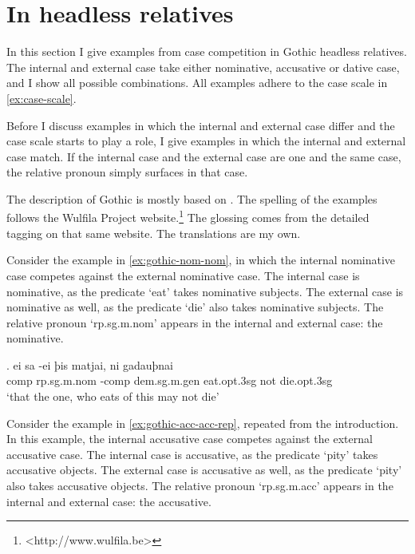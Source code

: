 \section{In headless relatives}\label{sec:pattern-rels}

In this section I give examples from case competition in Gothic headless relatives. The internal and external case take either nominative, accusative or dative case, and I show all possible combinations. All examples adhere to the case scale in \ref{ex:case-scale}.

Before I discuss examples in which the internal and external case differ and the case scale starts to play a role, I give examples in which the internal and external case match.
If the internal case and the external case are one and the same case, the relative pronoun simply surfaces in that case.

The description of Gothic is mostly based on \citep{harbert1978}. The spelling of the examples follows the Wulfila Project website.\footnote{
<http://www.wulfila.be>
} The glossing comes from the detailed tagging on that same website. The translations are my own.

Consider the example in \ref{ex:gothic-nom-nom}, in which the internal nominative case competes against the external nominative case.
The internal case is nominative, as the predicate  `eat' takes nominative subjects.
The external case is nominative as well, as the predicate  `die' also takes nominative subjects.
The relative pronoun  `\ac{rp}.\ac{sg}.\ac{m}.\ac{nom}' appears in the internal and external case: the nominative.

\exg. ei sa -ei þis matjai, ni gadauþnai\\
\ac{comp} \ac{rp}.\ac{sg}.\ac{m}.\ac{nom} -\ac{comp} \ac{dem}.\ac{sg}.\ac{m}.\ac{gen} eat.\ac{opt}.3\ac{sg}\scsub{[nom]} not die.\ac{opt}.3\ac{sg}\scsub{[nom]}\\
`that the one, who eats of this may not die' \label{ex:gothic-nom-nom}

Consider the example in \ref{ex:gothic-acc-acc-rep}, repeated from the introduction. In this example, the internal accusative case competes against the external accusative case.
The internal case is accusative, as the predicate  `pity' takes accusative objects.
The external case is accusative as well, as the predicate  `pity' also takes accusative objects.
The relative pronoun  `\ac{rp}.\ac{sg}.\ac{m}.\ac{acc}' appears in the internal and external case: the accusative.

